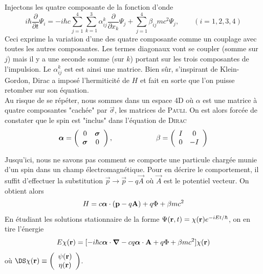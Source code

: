 Injectons les quatre composante de la fonction d'onde
\begin{equation}
i \hbar \frac{\partial}{\partial t} \Psi_i = -i \hbar c 
\sum_{j=1}^4 \sum_{k=1}^3 \alpha_{ij}^k 
\frac{\partial}{\partial x_k} \Psi_j 
+ \sum_{j=1}^4 \beta_{ij} mc^2 \Psi_j,\qquad (i=1,2,3,4)
\end{equation}
Ceci exprime la variation d'une des quatre composante comme un couplage avec toutes les autres 
composantes. Les termes diagonaux vont se coupler (somme sur $j$) mais il y a une seconde somme
(sur $k$) portant sur les trois composantes de l'impulsion. Le $\alpha^k_{ij}$ est est ainsi une 
matrice. Bien sûr, s'inspirant de Klein-Gordon, Dirac a imposé l'hermiticité de $H$ et fait en sorte
que l'on puisse retomber sur son équation.\\

Au risque de se répéter, nous sommes dans un espace 4D où $\alpha$ est une matrice à quatre 
composantes "cachée" par $\vec \sigma$, les matrices de \textsc{Pauli}. On est alors forcée de 
constater que le spin est "inclus" dans l'équation de \textsc{Dirac}
\begin{equation}
\mbox{\boldmath $ \alpha $} = 
\left( \begin{array}{cc} 0 & \mbox{\boldmath $ \sigma $} \\
\mbox{\boldmath $ \sigma $} & 0 \end{array} \right),\qquad\qquad\qquad
\beta = 
\left( 
\begin{array}{cc} I & 0 \\
0 & - I    \end{array} \right)
\end{equation}

Jusqu'ici, nous ne savons pas comment se comporte une particule chargée munie d'un spin dans un 
champ électromagnétique. Pour en décrire le comportement, il suffit d'effectuer la substitution
$\vec p \to \vec{p}-q\vec{A}$ où $\vec A$ est le potentiel vecteur. On obtient alors
\begin{equation}
H = 
c  \mbox{\boldmath $ \alpha $} \cdot  ( {\bf p} - q {\bf A} )
+ q \Phi + \beta m c^2
\end{equation}
En étudiant les solutions stationnaire de la forme $\Psi ({\bf r},t) = \chi({\bf r}) e^{-iEt/ \hbar}$,
on en tire l'énergie
\begin{equation}
E \chi({\bf r}) =
[ - i \hbar  c \mbox{\boldmath $ \alpha $} \cdot \mbox{\boldmath $ \nabla $}
- c q \mbox{\boldmath $ \alpha $} \cdot {\bf A} + q \Phi + \beta mc^2 ] \chi({\bf r})
\end{equation}
où $\DS \chi ({\bf r}) \equiv \left( \begin{array}{c}
 \psi({\bf r}) \\ \eta({\bf r}) \end{array} \right)$.\\


